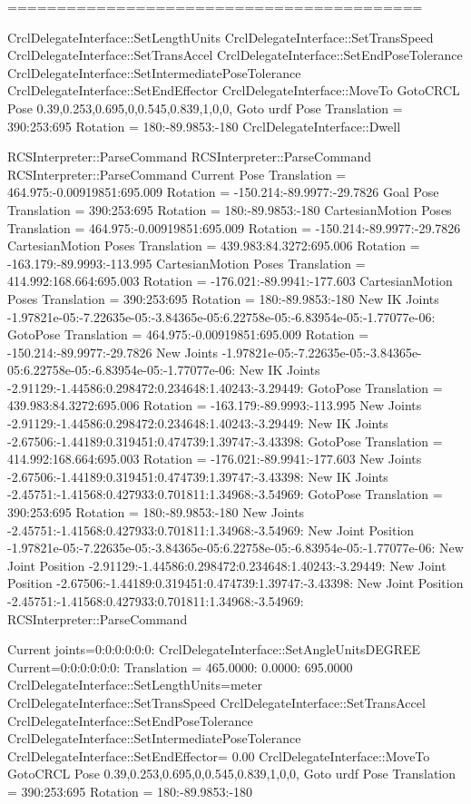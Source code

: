 ========================================== \begin{DoxyVerb}CrclDelegateInterface::SetLengthUnits
CrclDelegateInterface::SetTransSpeed
CrclDelegateInterface::SetTransAccel
CrclDelegateInterface::SetEndPoseTolerance
CrclDelegateInterface::SetIntermediatePoseTolerance
CrclDelegateInterface::SetEndEffector
CrclDelegateInterface::MoveTo
GotoCRCL Pose 0.39,0.253,0.695,0,0.545,0.839,1,0,0,
Goto urdf Pose Translation = 390:253:695
Rotation = 180:-89.9853:-180
CrclDelegateInterface::Dwell

RCSInterpreter::ParseCommand
RCSInterpreter::ParseCommand
RCSInterpreter::ParseCommand
Current Pose Translation = 464.975:-0.00919851:695.009
Rotation = -150.214:-89.9977:-29.7826
Goal Pose Translation = 390:253:695
Rotation = 180:-89.9853:-180
CartesianMotion  Poses Translation = 464.975:-0.00919851:695.009
Rotation = -150.214:-89.9977:-29.7826
CartesianMotion  Poses Translation = 439.983:84.3272:695.006
Rotation = -163.179:-89.9993:-113.995
CartesianMotion  Poses Translation = 414.992:168.664:695.003
Rotation = -176.021:-89.9941:-177.603
CartesianMotion  Poses Translation = 390:253:695
Rotation = 180:-89.9853:-180
New IK Joints -1.97821e-05:-7.22635e-05:-3.84365e-05:6.22758e-05:-6.83954e-05:-1.77077e-06:
GotoPose Translation = 464.975:-0.00919851:695.009
Rotation = -150.214:-89.9977:-29.7826
New Joints -1.97821e-05:-7.22635e-05:-3.84365e-05:6.22758e-05:-6.83954e-05:-1.77077e-06:
New IK Joints -2.91129:-1.44586:0.298472:0.234648:1.40243:-3.29449:
GotoPose Translation = 439.983:84.3272:695.006
Rotation = -163.179:-89.9993:-113.995
New Joints -2.91129:-1.44586:0.298472:0.234648:1.40243:-3.29449:
New IK Joints -2.67506:-1.44189:0.319451:0.474739:1.39747:-3.43398:
GotoPose Translation = 414.992:168.664:695.003
Rotation = -176.021:-89.9941:-177.603
New Joints -2.67506:-1.44189:0.319451:0.474739:1.39747:-3.43398:
New IK Joints -2.45751:-1.41568:0.427933:0.701811:1.34968:-3.54969:
GotoPose Translation = 390:253:695
Rotation = 180:-89.9853:-180
New Joints -2.45751:-1.41568:0.427933:0.701811:1.34968:-3.54969:
New Joint Position -1.97821e-05:-7.22635e-05:-3.84365e-05:6.22758e-05:-6.83954e-05:-1.77077e-06:
New Joint Position -2.91129:-1.44586:0.298472:0.234648:1.40243:-3.29449:
New Joint Position -2.67506:-1.44189:0.319451:0.474739:1.39747:-3.43398:
New Joint Position -2.45751:-1.41568:0.427933:0.701811:1.34968:-3.54969:
RCSInterpreter::ParseCommand


Current joints=0:0:0:0:0:0:
CrclDelegateInterface::SetAngleUnitsDEGREE
Current=0:0:0:0:0:0:
Translation =    465.0000:     0.0000:   695.0000
CrclDelegateInterface::SetLengthUnits=meter
CrclDelegateInterface::SetTransSpeed
CrclDelegateInterface::SetTransAccel
CrclDelegateInterface::SetEndPoseTolerance
CrclDelegateInterface::SetIntermediatePoseTolerance
CrclDelegateInterface::SetEndEffector= 0.00
CrclDelegateInterface::MoveTo
GotoCRCL Pose 0.39,0.253,0.695,0,0.545,0.839,1,0,0,
Goto urdf Pose Translation = 390:253:695
Rotation = 180:-89.9853:-180
\end{DoxyVerb}


